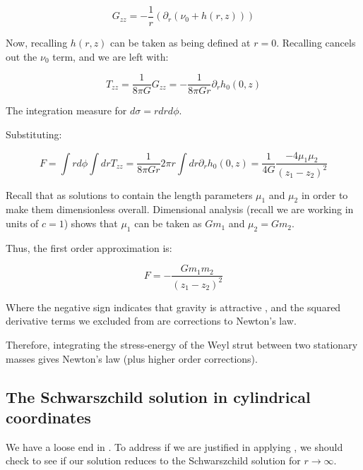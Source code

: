 \documentclass{article}
\begin{document}
\begin{equation}
\label{eq:G_zz_reduced}
G_{zz}=-\frac{1}{r}\left(\partial_{r}\left(\nu_0+h(r,z)\right)\right) 
\end{equation}

Now, recalling  $h(r,z)$ can be taken as being defined at $r=0$. Recalling  cancels out the $\nu_0$ term, and we are left with:

\begin{equation}
\label{eq:T_zz}
T_{zz}=\frac{1}{8\pi G}G_{zz}=-\frac{1}{8\pi Gr}\partial_{r}h_0(0,z)
\end{equation}

The integration measure for  $d\sigma=rdrd\phi$.

Substituting:

\begin{equation}
F=\int rd\phi\int dr T_{zz}=\frac{1}{8\pi Gr}2\pi r\int dr\partial_{r}h_0(0,z)=\frac{1}{4G}\frac{-4\mu_1\mu_2}{\left(z_1-z_2\right)^2}
\end{equation}

Recall that  as solutions to  contain the length parameters $\mu_1$ and $\mu_2$ in order to make them dimensionless overall. Dimensional analysis (recall we are working in units of $c=1$) shows that $\mu_1$ can be taken as $Gm_{1}$ and $\mu_2=Gm_2$.

Thus, the first order approximation is:

\begin{equation}
F=-\frac{Gm_{1}m_{2}}{\left(z_{1}-z_{2}\right)^{2}}
\end{equation}

Where the negative sign indicates that gravity is attractive \cite{carroll2003spacetime}, and the squared derivative terms we excluded from  are corrections to Newton's law.

Therefore, integrating the stress-energy of the Weyl strut between two stationary masses gives Newton's law (plus higher order corrections).

\subsection{The Schwarszchild solution in cylindrical coordinates}

We have a loose end in . To address if we are justified in applying , we should check to see if our solution reduces to the Schwarszchild solution for $r\rightarrow\infty$.
\end{document}

